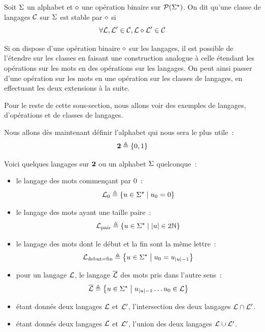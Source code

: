 \begin{definition}
  Soit $\Sigma$ un alphabet et $\mathbin{\diamond}$ une opération binaire sur
  $\mathcal{P}(\Sigma^{\star})$. On dit qu'une classe de langages $\mathcal{C}$ sur $\Sigma$
  est stable par $\mathbin{\diamond}$ si
  \[\forall \mathcal L,\mathcal L'\in\mathcal{C}, \mathcal L\mathbin{\diamond} \mathcal L'\in\mathcal{C}\]
\end{definition}

\begin{remark}
  Si on dispose d'une opération binaire $\mathbin{\diamond}$ sur les langages, il est
  possible de l'étendre sur les classes en faisant une construction analogue
  à celle étendant les opérations sur les mots en des opérations sur les
  langages. On peut ainsi passer d'une opération sur les mots en une opération
  sur les classes de langages, en effectuant les deux extensions à la suite.
\end{remark}

Pour le reste de cette sous-section, nous allons voir des exemples de langages,
d'opérations et de classes de langages.

\begin{example}
  Nous allons dès maintenant définir l'alphabet qui nous sera le plus utile~:
  \[\bm{2} \triangleq \{0,1\}\]

  Voici quelques langages sur $\bm{2}$ ou un alphabet $\Sigma$ quelconque~:
  \begin{itemize}
  \item le langage des mots commençant par $0$~:
    \[\mathcal L_0 \triangleq \left\{ u\in\Sigma^{\star} \;\middle\vert\; u_0 = 0 \right\}\]
  \item le langage des mots ayant une taille paire~:
    \[\mathcal L_{\operatorname{pair}} \triangleq \left\{ u\in\Sigma^{\star} \;\middle\vert\; \left|u\right|\in 2\mathbb N \right\}\]
  \item le langage des mots dont le début et la fin sont la même lettre~:
    \[\mathcal L_{\mathrm{debut}=\mathrm{fin}}\triangleq
    \left\{ u\in\Sigma^{\star} \;\middle\vert\; u_0 = u_{\left|u\right| - 1} \right\}\]
  \item pour un langage $\mathcal L$, le langage $\overline{\mathcal L}$ des mots pris dans
    l'autre sens~:
    \[\overline{\mathcal L}\triangleq
    \left\{ u\in\Sigma^{\star} \;\middle\vert\; u_{\left|u\right|-1}\ldots u_0\in\mathcal L \right\}\]
  \item étant donnés deux langages $\mathcal L$ et $\mathcal L'$, l'intersection des
    deux langages $\mathcal L \cap \mathcal L'$.
  \item étant donnés deux langages $\mathcal L$ et $\mathcal L'$, l'union des deux
    langages $\mathcal L\cup\mathcal L'$.
  \end{itemize}
\end{example}

